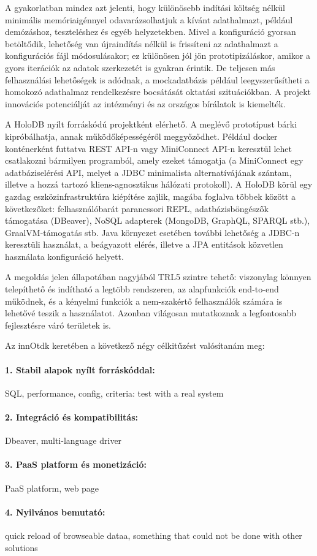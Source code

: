 \documentclass[12pt]{article}
\begin{document}
A gyakorlatban mindez azt jelenti, hogy különösebb indítási költség nélkül minimális memóriaigénnyel odavarázsolhatjuk a kívánt adathalmazt, például demózáshoz, teszteléshez és egyéb helyzetekben.
Mivel a konfiguráció gyorsan betöltődik, lehetőség van újraindítás nélkül is frissíteni az adathalmazt a konfigurációs fájl módosulásakor; ez különösen jól jön prototipizáláskor, amikor a gyors iterációk az adatok szerkezetét is gyakran érintik.
De teljesen más felhasználási lehetőségek is adódnak, a mockadatbázis például leegyszerűsítheti a homokozó adathalmaz rendelkezésre bocsátását oktatási szituációkban.
A projekt innovációs potenciálját az intézményi és az országos bírálatok is kiemelték.

A HoloDB nyílt forráskódú projektként elérhető.
A meglévő prototípust bárki kipróbálhatja, annak működőképességéről meggyőződhet.
Például docker konténerként futtatva REST API-n vagy MiniConnect API-n keresztül lehet csatlakozni bármilyen programból, amely ezeket támogatja
(a MiniConnect egy adatbáziselérési API, melyet a JDBC minimalista alternatívájának szántam, illetve a hozzá tartozó kliens-agnosztikus hálózati protokoll).
A HoloDB körül egy gazdag eszközinfrastruktúra kiépítése zajlik, magába foglalva többek között a következőket: felhasználóbarát parancssori REPL, adatbázisböngészők támogatása (DBeaver), NoSQL adapterek (MongoDB, GraphQL, SPARQL stb.), GraalVM-támogatás stb.
Java környezet esetében további lehetőség a JDBC-n keresztüli használat,
a beágyazott elérés, illetve a JPA entitások közvetlen használata konfiguráció helyett.

A megoldás jelen állapotában nagyjából TRL5 szintre tehető:
viszonylag könnyen telepíthető és indítható a legtöbb rendszeren,
az alapfunkciók end-to-end működnek,
és a kényelmi funkciók a nem-szakértő felhasználók számára is lehetővé teszik a használatot.
Azonban világosan mutatkoznak a legfontosabb fejlesztésre váró területek is.

Az innOtdk keretében a következő négy célkitűzést valósítanám meg:

\paragraph{1. Stabil alapok nyílt forráskóddal:}{
SQL, performance, config, criteria: test with a real system
}

\paragraph{2. Integráció és kompatibilitás:}{
Dbeaver, multi-language driver
}

\paragraph{3. PaaS platform és monetizáció:}{
PaaS platform, web page
}

\paragraph{4. Nyilvános bemutató:}{
quick reload of browseable dataa, something that could not be done with other solutions
}
\end{document}
